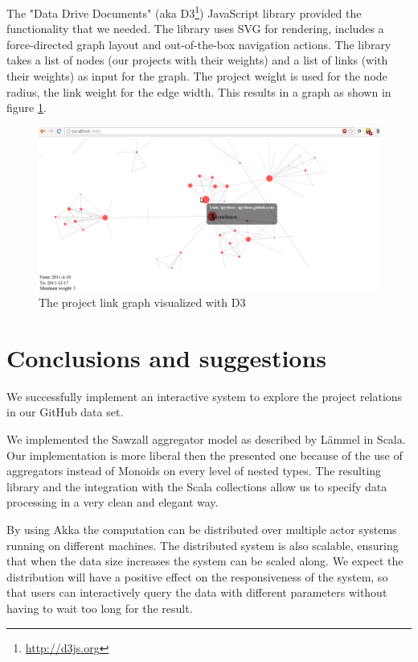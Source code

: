 \documentclass[10pt,a4paper]{article}
\begin{document}
The "Data Drive Documents" (aka D3\footnote{\url{http://d3js.org}}) JavaScript library provided the functionality that we needed. The library uses SVG for rendering, includes a force-directed graph layout and out-of-the-box navigation actions. The library takes a list of nodes (our projects with their weights) and a list of links (with their weights) as input for the graph. The project weight is used for the node radius, the link weight for the edge width. This results in a graph as shown in figure \ref{fig:d3-graph}.

\begin{figure}[htb]
    \centering
    \includegraphics[width=\textwidth]{d3-graph}
    \caption{The project link graph visualized with D3}
    \label{fig:d3-graph}
\end{figure}

\section{Conclusions and suggestions}\label{sec:conclusions}

We successfully implement an interactive system to explore the project relations in our GitHub data set.

We implemented the Sawzall aggregator model as described by L\"ammel in Scala. Our implementation is more liberal then the presented one because of the use of aggregators instead of Monoids on every level of nested types. The resulting library and the integration with the Scala collections allow us to specify data processing in a very clean and elegant way.

By using Akka the computation can be distributed over multiple actor systems running on different machines. The distributed system is also scalable, ensuring that when the data size increases the system can be scaled along. We expect the distribution will have a positive effect on the responsiveness of the system, so that users can interactively query the data with different parameters without having to wait too long for the result.
\end{document}
